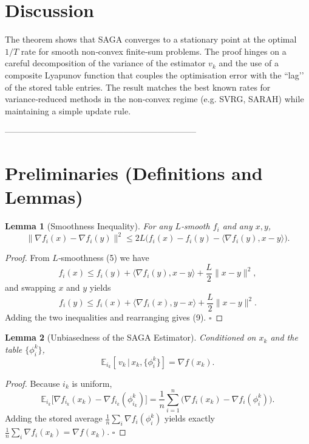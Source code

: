 \documentclass{article}
\newtheorem{lemma}{Lemma}
\newcommand{\E}{\mathbb{E}}
\newcommand{\grad}{\nabla}
\begin{document}
\section*{Discussion}
The theorem shows that SAGA converges to a stationary point at the optimal $1/T$ rate for smooth non‑convex finite‑sum problems. The proof hinges on a careful decomposition of the variance of the estimator $v_k$ and the use of a composite Lyapunov function that couples the optimisation error with the “lag’’ of the stored table entries. The result matches the best known rates for variance‑reduced methods in the non‑convex regime (e.g. SVRG, SARAH) while maintaining a simple update rule.

--------------------------------------------------------------------

\section*{Preliminaries (Definitions and Lemmas)}
\begin{lemma}[Smoothness Inequality]\label{lem:smooth}
For any $L$‑smooth $f_i$ and any $x,y$,
\[
\|\grad f_i(x)-\grad f_i(y)\|^{2}\le 2L\bigl(f_i(x)-f_i(y)-\langle\grad f_i(y),x-y\rangle\bigr).
\tag{9}
\]
\end{lemma}
\begin{proof}
From $L$‑smoothness (5) we have
\[
f_i(x)\le f_i(y)+\langle\grad f_i(y),x-y\rangle+\frac{L}{2}\|x-y\|^{2},
\]
and swapping $x$ and $y$ yields
\[
f_i(y)\le f_i(x)+\langle\grad f_i(x),y-x\rangle+\frac{L}{2}\|x-y\|^{2}.
\]
Adding the two inequalities and rearranging gives (9). \hfill $\square$
\end{proof}

\begin{lemma}[Unbiasedness of the SAGA Estimator]\label{lem:unbiased}
Conditioned on $x_k$ and the table $\{\phi_i^{k}\}$,
\[
\E_{i_k}[\,v_k\,|\,x_k,\{\phi_i^{k}\}]=\grad f(x_k).
\tag{10}
\]
\end{lemma}
\begin{proof}
Because $i_k$ is uniform,
\[
\E_{i_k}\bigl[\grad f_{i_k}(x_k)-\grad f_{i_k}(\phi_{i_k}^{k})\bigr]
    =\frac1n\sum_{i=1}^{n}\bigl(\grad f_i(x_k)-\grad f_i(\phi_i^{k})\bigr).
\]
Adding the stored average $\frac1n\sum_{i}\grad f_i(\phi_i^{k})$ yields exactly $\frac1n\sum_i\grad f_i(x_k)=\grad f(x_k)$. \hfill $\square$
\end{proof}
\end{document}
